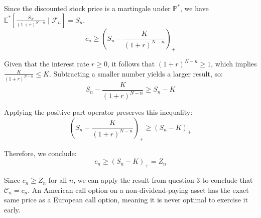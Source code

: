 \begin{enumerate}
            Since the discounted stock price is a martingale under $\mathbb{P}^*$, we have $\mathbb{E}^*[\frac{S_N}{(1+r)^{N-n}} \mid \mathcal{F}_n] = S_n$.
            \[ c_n \ge \left( S_n - \frac{K}{(1+r)^{N-n}} \right)_+ \]

            Given that the interest rate $r \ge 0$, it follows that $(1+r)^{N-n} \ge 1$, which implies $\frac{K}{(1+r)^{N-n}} \le K$.
            Subtracting a smaller number yields a larger result, so:
            \[ S_n - \frac{K}{(1+r)^{N-n}} \ge S_n - K \]

            Applying the positive part operator preserves this inequality:
            \[ \left( S_n - \frac{K}{(1+r)^{N-n}} \right)_+ \ge (S_n - K)_+ \]

            Therefore, we conclude:
            \[ c_n \ge (S_n - K)_+ = Z_n \]

            Since $c_n \ge Z_n$ for all $n$, we can apply the result from question 3 to conclude that $\mathcal{C}_n = c_n$. An American call option on a non-dividend-paying asset has the exact same price as a European call option, meaning it is never optimal to exercise it early.

\end{enumerate}